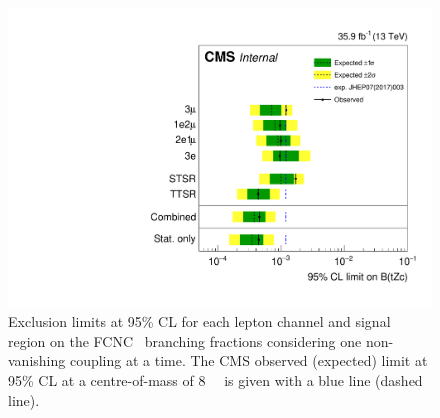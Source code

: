 \begin{figure}[htbp]
	\centering
	\includegraphics[width=0.7\linewidth]{6_Search/Figures/TOP-17-017_limitsZctStat.pdf}
	\caption{Exclusion limits at 95\% CL for each lepton channel and signal region on the FCNC \Zct\ branching fractions considering one non-vanishing coupling at a time. The CMS observed (expected) limit at 95\% CL at a centre-of-mass of 8~\TeV~\cite{Sirunyan:2017kkr} is given with a blue line (dashed line).}	
	\label{fig:exclusionlimitbrcompc}
\end{figure}

\newpage
